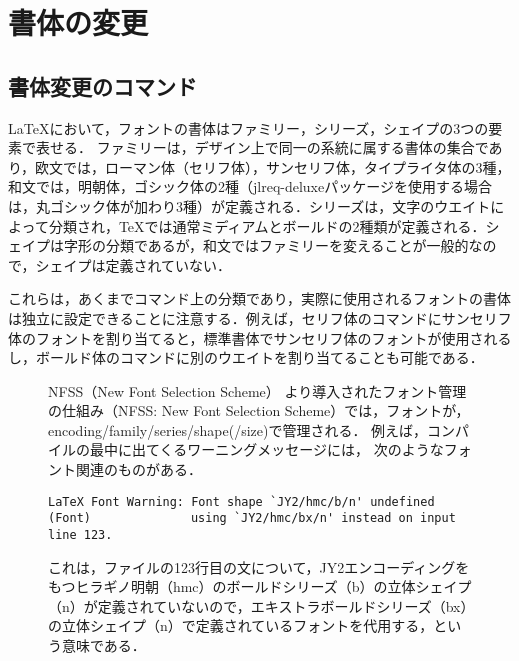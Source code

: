 \section{書体の変更}

\subsection{書体変更のコマンド}

{\LaTeX}において，フォントの書体はファミリー，シリーズ，シェイプの3つの要素で表せる．
ファミリーは，デザイン上で同一の系統に属する書体の集合であり，欧文では，ローマン体（セリフ体），サンセリフ体，タイプライタ体の3種，和文では，明朝体，ゴシック体の2種（jlreq-deluxeパッケージを使用する場合は，丸ゴシック体が加わり3種）が定義される．シリーズは，文字のウエイトによって分類され，{\TeX}では通常ミディアムとボールドの2種類が定義される．シェイプは字形の分類であるが，和文ではファミリーを変えることが一般的なので，シェイプは定義されていない．
\begin{screen}
\small\sffamily
これらは，あくまでコマンド上の分類であり，実際に使用されるフォントの書体は独立に設定できることに注意する．例えば，セリフ体のコマンドにサンセリフ体のフォントを割り当てると，標準書体でサンセリフ体のフォントが使用されるし，ボールド体のコマンドに別のウエイトを割り当てることも可能である．
\end{screen}

\begin{figure}[b]
\begin{itembox}[l]{NFSS（New Font Selection Scheme）}
\small\sffamily\mgfamily
{\LaTeXe}より導入されたフォント管理の仕組み（NFSS: New Font Selection Scheme）では，フォントが，encoding/family/series/shape(/size)で管理される．
例えば，コンパイルの最中に出てくるワーニングメッセージには，
次のようなフォント関連のものがある．
\begin{verbatim}
LaTeX Font Warning: Font shape `JY2/hmc/b/n' undefined
(Font)    　　　　　　using `JY2/hmc/bx/n' instead on input line 123.
\end{verbatim}
これは，ファイルの123行目の文について，JY2エンコーディングをもつヒラギノ明朝（hmc）のボールドシリーズ（b）の立体シェイプ（n）が定義されていないので，エキストラボールドシリーズ（bx）の立体シェイプ（n）で定義されているフォントを代用する，という意味である．
\end{itembox}
\end{figure}

